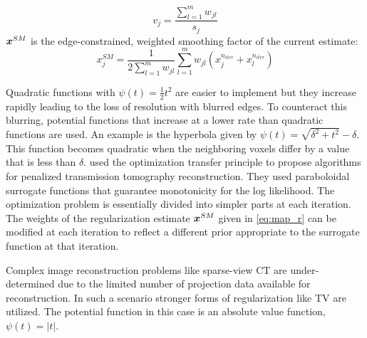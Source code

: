 \begin{equation}\label{eq:map_v}
v_{j}=\frac{\sum_{l=1}^{m} w_{j l}}{s_{j}}
\end{equation}
$\bm{x}^{SM}$ is the edge-constrained, weighted smoothing factor of the current estimate:
\begin{equation}\label{eq:map_r}
x_{j}^{S M}=\frac{1}{2 \sum_{l=1}^{m} w_{j l}} \sum_{l=1}^{m} w_{j l}\left(x_{j}^{n_{iter}}+x_{l}^{n_{iter}}\right)
\end{equation}

Quadratic functions with $\psi(t) = \frac{1}{2} t^2$ are easier to implement but they increase rapidly leading to the loss of resolution with blurred edges. To counteract this blurring, potential functions that increase at a lower rate than quadratic functions are used. An example is the hyperbola given by $\psi(t)=\sqrt{\delta^{2}+t^{2}}-\delta$. This function becomes quadratic when the neighboring voxels differ by a value that is less than $\delta$. \cite{erdogan2002monotonic} used the optimization transfer principle to propose algorithms for penalized transmission tomography reconstruction. They used paraboloidal surrogate functions that guarantee monotonicity for the log likelihood. The optimization problem is essentially divided into simpler parts at each iteration. The weights of the regularization estimate $\bm{x}^{S M}$ given in \ref{eq:map_r} can be modified at each iteration to reflect a different prior appropriate to the surrogate function at that iteration.   

Complex image reconstruction problems like sparse-view \ac{CT} are under-determined due to the limited number of projection data available for reconstruction. In such a scenario stronger forms of regularization like \ac{TV} are utilized. The potential function in this case is an absolute value function, $\psi(t) = |t|$.  




